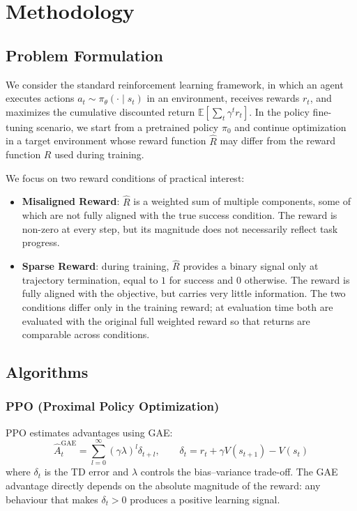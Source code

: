 \chapter{Methodology} \label{Chap3}

\section{Problem Formulation}

We consider the standard reinforcement learning framework, in which an agent executes actions $a_t \sim \pi_\theta(\cdot \mid s_t)$ in an environment, receives rewards $r_t$, and maximizes the cumulative discounted return $\mathbb{E}[\sum_{t} \gamma^t r_t]$. In the policy fine-tuning scenario, we start from a pretrained policy $\pi_0$ and continue optimization in a target environment whose reward function $\hat{R}$ may differ from the reward function $R$ used during training.

We focus on two reward conditions of practical interest:

\begin{itemize}
  \item \textbf{Misaligned Reward}: $\hat{R}$ is a weighted sum of multiple components, some of which are not fully aligned with the true success condition. The reward is non-zero at every step, but its magnitude does not necessarily reflect task progress.
  \item \textbf{Sparse Reward}: during training, $\hat{R}$ provides a binary signal only at trajectory termination, equal to $1$ for success and $0$ otherwise. The reward is fully aligned with the objective, but carries very little information. The two conditions differ only in the training reward; at evaluation time both are evaluated with the original full weighted reward so that returns are comparable across conditions.
\end{itemize}

\section{Algorithms}

\subsection{PPO (Proximal Policy Optimization)}

PPO estimates advantages using GAE:
\begin{equation}
  \hat{A}_t^{\text{GAE}} = \sum_{l=0}^{\infty} (\gamma\lambda)^l \delta_{t+l}, \qquad \delta_t = r_t + \gamma V(s_{t+1}) - V(s_t)
\end{equation}
where $\delta_t$ is the TD error and $\lambda$ controls the bias--variance trade-off. The GAE advantage directly depends on the absolute magnitude of the reward: any behaviour that makes $\delta_t > 0$ produces a positive learning signal.

